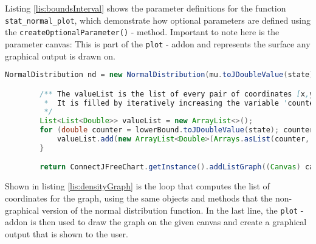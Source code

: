 Listing \ref{lis:boundsInterval} shows the parameter definitions for the function \lstinline{stat_normal_plot}, which demonstrate how optional parameters are defined using the \lstinline{createOptionalParameter()} - method. Important to note here is the parameter canvas: This is part of the \lstinline{plot} - addon and represents the surface any graphical output is drawn on.

\begin{center}
	\begin{lstlisting}[caption={Computation of propability density graph for Normal Distributions}, language={java}, label=lis:densityGraph]
		NormalDistribution nd = new NormalDistribution(mu.toJDoubleValue(state), sigma.toJDoubleValue(state));

        /** The valueList is the list of every pair of coordinates [x,y] that the graph consists of.
         *  It is filled by iteratively increasing the variable 'counter' (x), and calculating the density for every new value of 'counter' (y).
         */
        List<List<Double>> valueList = new ArrayList<>();
        for (double counter = lowerBound.toJDoubleValue(state); counter < upperBound.toJDoubleValue(state); counter += interval.toJDoubleValue(state)) {
            valueList.add(new ArrayList<Double>(Arrays.asList(counter, nd.density(counter))));
        }

        return ConnectJFreeChart.getInstance().addListGraph((Canvas) canvas, valueList, "Probability Density Function (mean: " + mu.toString() + ", standard deviation: " + sigma.toString(), Defaults.DEFAULT_COLOR_SCHEME, false);
	\end{lstlisting}
\end{center}

Shown in listing \ref{lis:densityGraph} is the loop that computes the list of coordinates for the graph, using the same objects and methods that the non-graphical version of the normal distribution function. In the last line, the \lstinline{plot} - addon is then used to draw the graph on the given canvas and create a graphical output that is shown to the user.